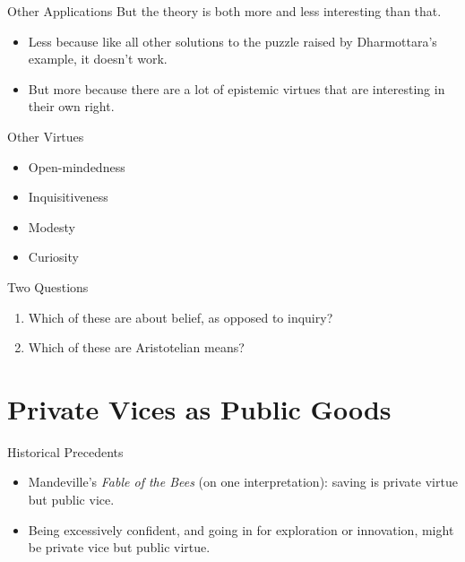 \documentclass[
  ignorenonframetext,
]{beamer}
\providecommand{\tightlist}{%
  \setlength{\itemsep}{0pt}\setlength{\parskip}{0pt}}
\begin{document}
\begin{frame}{Other Applications}
\protect\hypertarget{other-applications}{}
But the theory is both more and less interesting than that.

\begin{itemize}
\tightlist
\item
  Less because like all other solutions to the puzzle raised by
  Dharmottara's example, it doesn't work.
\item
  But more because there are a lot of epistemic virtues that are
  interesting in their own right.
\end{itemize}
\end{frame}

\begin{frame}{Other Virtues}
\protect\hypertarget{other-virtues}{}
\begin{itemize}[<+->]
\tightlist
\item
  Open-mindedness
\item
  Inquisitiveness
\item
  Modesty
\item
  Curiosity
\end{itemize}
\end{frame}

\begin{frame}{Two Questions}
\protect\hypertarget{two-questions}{}
\begin{enumerate}[<+->]
\tightlist
\item
  Which of these are about belief, as opposed to inquiry?
\item
  Which of these are Aristotelian means?
\end{enumerate}
\end{frame}

\hypertarget{private-vices-as-public-goods}{%
\section{Private Vices as Public
Goods}\label{private-vices-as-public-goods}}

\begin{frame}{Historical Precedents}
\protect\hypertarget{historical-precedents}{}
\begin{itemize}
\tightlist
\item
  Mandeville's \emph{Fable of the Bees} (on one interpretation): saving
  is private virtue but public vice.
\item
  Being excessively confident, and going in for exploration or
  innovation, might be private vice but public virtue.
\end{itemize}
\end{frame}
\end{document}
